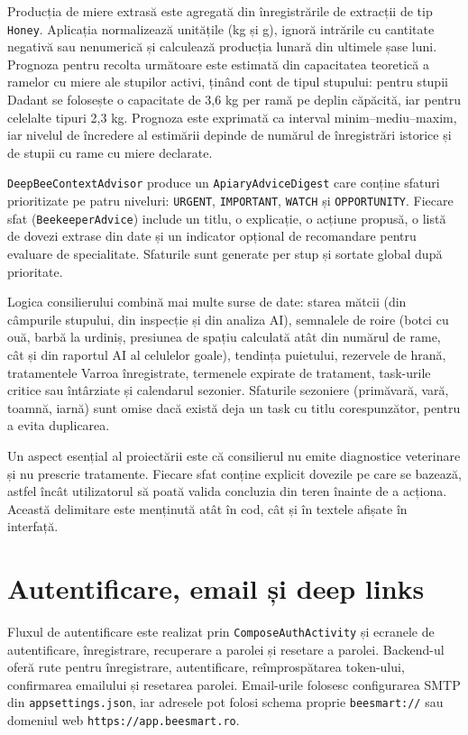 Producția de miere extrasă este agregată din înregistrările de extracții de tip \texttt{Honey}. Aplicația normalizează unitățile (kg și g), ignoră intrările cu cantitate negativă sau nenumerică și calculează producția lunară din ultimele șase luni. Prognoza pentru recolta următoare este estimată din capacitatea teoretică a ramelor cu miere ale stupilor activi, ținând cont de tipul stupului: pentru stupii Dadant se folosește o capacitate de 3,6 kg per ramă pe deplin căpăcită, iar pentru celelalte tipuri 2,3 kg. Prognoza este exprimată ca interval minim--mediu--maxim, iar nivelul de încredere al estimării depinde de numărul de înregistrări istorice și de stupii cu rame cu miere declarate.

\texttt{DeepBeeContextAdvisor} produce un \texttt{ApiaryAdviceDigest} care conține sfaturi prioritizate pe patru niveluri: \texttt{URGENT}, \texttt{IMPORTANT}, \texttt{WATCH} și \texttt{OPPORTUNITY}. Fiecare sfat (\texttt{BeekeeperAdvice}) include un titlu, o explicație, o acțiune propusă, o listă de dovezi extrase din date și un indicator opțional de recomandare pentru evaluare de specialitate. Sfaturile sunt generate per stup și sortate global după prioritate.

Logica consilierului combină mai multe surse de date: starea mătcii (din câmpurile stupului, din inspecție și din analiza AI), semnalele de roire (botci cu ouă, barbă la urdiniș, presiunea de spațiu calculată atât din numărul de rame, cât și din raportul AI al celulelor goale), tendința puietului, rezervele de hrană, tratamentele Varroa înregistrate, termenele expirate de tratament, task-urile critice sau întârziate și calendarul sezonier. Sfaturile sezoniere (primăvară, vară, toamnă, iarnă) sunt omise dacă există deja un task cu titlu corespunzător, pentru a evita duplicarea.

Un aspect esențial al proiectării este că consilierul nu emite diagnostice veterinare și nu prescrie tratamente. Fiecare sfat conține explicit dovezile pe care se bazează, astfel încât utilizatorul să poată valida concluzia din teren înainte de a acționa. Această delimitare este menținută atât în cod, cât și în textele afișate în interfață.

\section{Autentificare, email și deep links}

Fluxul de autentificare este realizat prin \texttt{ComposeAuthActivity} și ecranele de autentificare, înregistrare, recuperare a parolei și resetare a parolei. Backend-ul oferă rute pentru înregistrare, autentificare, reîmprospătarea token-ului, confirmarea emailului și resetarea parolei. Email-urile folosesc configurarea SMTP din \texttt{appsettings.json}, iar adresele pot folosi schema proprie \texttt{beesmart://} sau domeniul web \texttt{https://app.beesmart.ro}.


